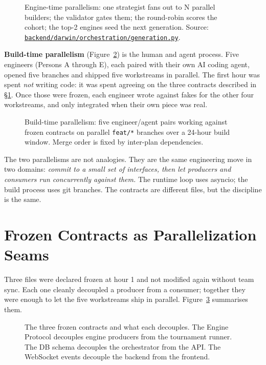 \documentclass[11pt]{article}
\begin{document}
\begin{figure}[h!]
\centering

\caption{Engine-time parallelism: one strategist fans out to N parallel
builders; the validator gates them; the round-robin scores the cohort;
the top-2 engines seed the next generation. Source:
\href{run:../backend/darwin/orchestration/generation.py}{\texttt{backend/darwin/orchestration/generation.py}}.}
\label{fig:runtime-pipeline}
\end{figure}

\textbf{Build-time parallelism} (Figure~\ref{fig:build-parallelism}) is
the human and agent process. Five engineers (Persons A through E),
each paired with their own AI coding agent, opened five branches and
shipped five workstreams in parallel. The first hour was spent
\emph{not} writing code: it was spent agreeing on the three contracts
described in \S\ref{sec:frozen-contracts}. Once those were frozen, each
engineer wrote against fakes for the other four workstreams, and only
integrated when their own piece was real.

\begin{figure}[h!]
\centering

\caption{Build-time parallelism: five engineer/agent pairs working
against frozen contracts on parallel \texttt{feat/*} branches over a
24-hour build window. Merge order is fixed by inter-plan dependencies.}
\label{fig:build-parallelism}
\end{figure}

The two parallelisms are not analogies. They are the same engineering
move in two domains: \emph{commit to a small set of interfaces, then let
producers and consumers run concurrently against them.} The runtime
loop uses asyncio; the build process uses git branches. The contracts
are different files, but the discipline is the same.

\section{Frozen Contracts as Parallelization Seams}
\label{sec:frozen-contracts}

Three files were declared frozen at hour 1 and not modified again
without team sync. Each one cleanly decoupled a producer from a
consumer; together they were enough to let the five workstreams ship in
parallel. Figure~\ref{fig:frozen-contracts} summarises them.

\begin{figure}[h!]
\centering

\caption{The three frozen contracts and what each decouples.
The Engine Protocol decouples engine producers from the tournament
runner. The DB schema decouples the orchestrator from the API. The
WebSocket events decouple the backend from the frontend.}
\label{fig:frozen-contracts}
\end{figure}
\end{document}
